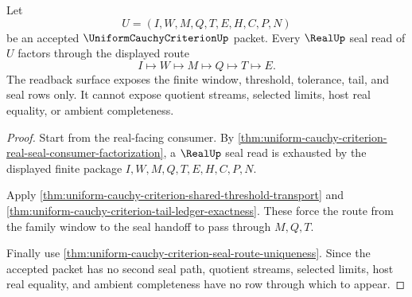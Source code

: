 \begin{theorem}
\label{thm:uniform-cauchy-criterion-root-seal-readback}
Let
$$
U=(I,W,M,Q,T,E,H,C,P,N)
$$
be an accepted $\UniformCauchyCriterionUp$ packet. Every $\RealUp$ seal read of $U$ factors through the displayed route
$$
I \longmapsto W \longmapsto M \longmapsto Q \longmapsto T \longmapsto E.
$$
The readback surface exposes the finite window, threshold, tolerance, tail, and seal rows only. It cannot expose quotient streams, selected limits, host real equality, or ambient completeness.
\end{theorem}
\begin{proof}
Start from the real-facing consumer. By \autoref{thm:uniform-cauchy-criterion-real-seal-consumer-factorization}, a $\RealUp$ seal read is exhausted by the displayed finite package $I,W,M,Q,T,E,H,C,P,N$.

Apply \autoref{thm:uniform-cauchy-criterion-shared-threshold-transport} and \autoref{thm:uniform-cauchy-criterion-tail-ledger-exactness}. These force the route from the family window to the seal handoff to pass through $M,Q,T$.

Finally use \autoref{thm:uniform-cauchy-criterion-seal-route-uniqueness}. Since the accepted packet has no second seal path, quotient streams, selected limits, host real equality, and ambient completeness have no row through which to appear.
\end{proof}

